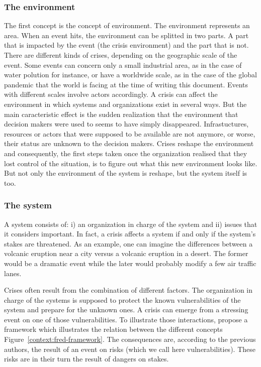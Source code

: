 \subsubsection{The environment}
The first concept is the concept of environment.
The environment represents an area.
When an event hits, the environment can be splitted in two parts.
A part that is impacted by the event (the crisis environment) and the part that is not.
There are different kinds of crises, depending on the geographic scale of the event.
Some events can concern only a small industrial area, as in the case of water polution for instance, or have a worldwide scale, as in the case of the global pandemic that the world is facing at the time of writing this document.
Events with different scales involve actors accordingly.
A crisis can affect the environment in which systems and organizations exist in several ways.
But the main caracteristic effect is the sudden realization that the environment that decision makers were used to seems to have simply disappeared.
Infrastuctures, resources or actors that were supposed to be available are not anymore, or worse, their status are unknown to the decision makers.
Crises reshape the environment and consequently, the first steps taken once the organization realised that they lost control of the situation, is to figure out what this new environment looks like.
But not only the environment of the system is reshape, but the system itself is too.

\subsubsection{The system}
A system consists of: i) an organization in charge of the system and ii) issues that it considers important.
In fact, a crisis affects a system if and only if the system's stakes are threatened.
As an example, one can imagine the differences between a volcanic eruption near a city versus a volcanic eruption in a desert.
The former would be a dramatic event while the later would probably modify a few air traffic lanes.

Crises often result from the combination of different factors.
The organization in charge of the systems is supposed to protect the known vulnerabilities of the system and prepare for the unknown ones.
A crisis can emerge from a stressing event on one of those vulnerabilities.
To illustrate those interactions, \textcite{benabenCollaborativeSystemsCrisis2014} propose a framework which illustrates the relation between the different concepts Figure~\ref{context:fred-framework}.
The consequences are, according to the previous authors, the result of an event on risks (which we call here vulnerabilities).
These risks are in their turn the result of dangers on stakes.

